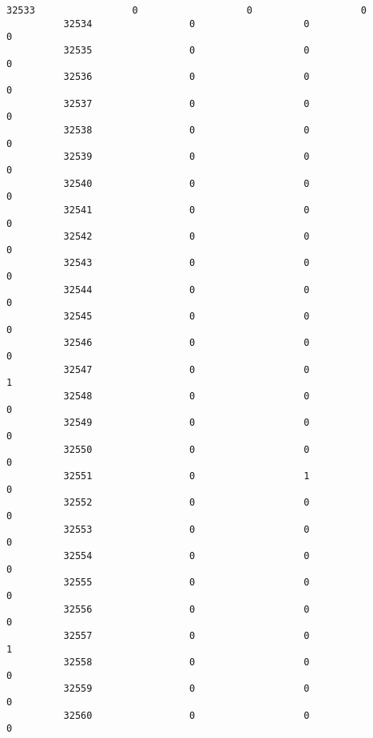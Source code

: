 \documentclass[11pt]{article}
\begin{document}
\begin{Verbatim}[commandchars=\\\{\}]
          32533                 0                   0                   0   
          32534                 0                   0                   0   
          32535                 0                   0                   0   
          32536                 0                   0                   0   
          32537                 0                   0                   0   
          32538                 0                   0                   0   
          32539                 0                   0                   0   
          32540                 0                   0                   0   
          32541                 0                   0                   0   
          32542                 0                   0                   0   
          32543                 0                   0                   0   
          32544                 0                   0                   0   
          32545                 0                   0                   0   
          32546                 0                   0                   0   
          32547                 0                   0                   1   
          32548                 0                   0                   0   
          32549                 0                   0                   0   
          32550                 0                   0                   0   
          32551                 0                   1                   0   
          32552                 0                   0                   0   
          32553                 0                   0                   0   
          32554                 0                   0                   0   
          32555                 0                   0                   0   
          32556                 0                   0                   0   
          32557                 0                   0                   1   
          32558                 0                   0                   0   
          32559                 0                   0                   0   
          32560                 0                   0                   0   
          

\end{Verbatim}
\end{document}
